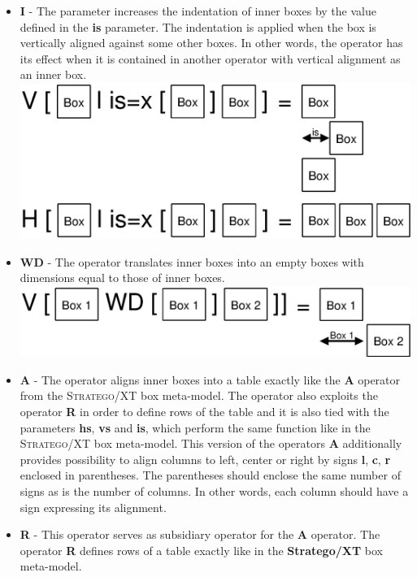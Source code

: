 \documentclass[12pt,notitlepage,a4paper]{report}
\begin{document}
\begin{itemize}
\item \textbf{I} - The parameter increases the indentation of inner boxes by the value defined in the \textbf{is} parameter. The indentation is applied when the box is vertically aligned against some other boxes. In other words, the operator has its effect when it is contained in another operator with vertical alignment as an inner box.
\includegraphics[scale=0.4]{pictures/Brand-Visser-I.eps}
\item \textbf{WD} - The operator translates inner boxes into an empty boxes with dimensions equal to those of inner boxes.
\includegraphics[scale=0.4]{pictures/Brand-Visser-WD.eps}
\item \textbf{A} - The operator aligns inner boxes into a table exactly like the \textbf{A} operator from the \textsc{Stratego/XT} box meta-model. The operator also exploits the operator \textbf{R} in order to define rows of the table and it is also tied with the parameters \textbf{hs}, \textbf{vs} and \textbf{is}, which perform the same function like in the \textsc{Stratego/XT} box meta-model. This version of the operators \textbf{A} additionally provides possibility to align columns to left, center or right by signs \textbf{l}, \textbf{c}, \textbf{r} enclosed in parentheses. The parentheses should enclose the same number of signs as is the number of columns. In other words, each column should have a sign expressing its alignment.
\item \textbf{R} - This operator serves as subsidiary operator for the \textbf{A} operator. The operator \textbf{R} defines rows of a table exactly like in the \textbf{Stratego/XT} box meta-model. 
\end{itemize}
\end{document}

